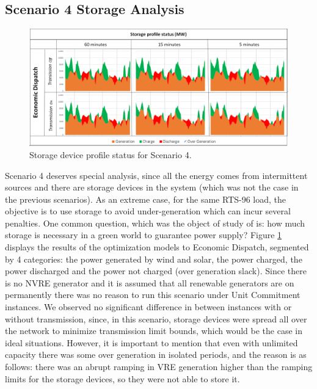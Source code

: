 \documentclass[12pt,LUDisStyle,twosided]{book}
\begin{document}
\newpage
\subsection{Scenario 4 Storage Analysis}

\begin{figure}[H] 
	\begin{center}
		\includegraphics[width=\textwidth,keepaspectratio]{StorageProfileStatusS4.png}
	  	\caption{Storage device profile status for Scenario 4.}
     	\label{fig:storageprofilestatus}
	\end{center}
\end{figure}

Scenario 4 deserves special analysis, since all the energy comes from intermittent sources and there are storage devices in the system (which was not the case in the previous scenarios). As an extreme case, for the same RTS-96 load, the objective is to use storage to avoid under-generation which can incur several penalties. One common question, which was the object of study of \citeauthor{safaei} \cite{safaei} is: how much storage is necessary in a green world to guarantee power supply? Figure \ref{fig:storageprofilestatus} displays the results of the optimization models to Economic Dispatch, segmented by 4 categories: the power generated by wind and solar, the power charged, the power discharged and the power not charged (over generation slack). Since there is no NVRE generator and it is assumed that all renewable generators are on permanently there was no reason to run this scenario under Unit Commitment instances. We observed no significant difference in between instances with or without transmission, since, in this scenario, storage devices were spread all over the network to minimize transmission limit bounds, which would be the case in ideal situations. However, it is important to mention that even with unlimited capacity there was some over generation in isolated periods, and the reason is as follows: there was an abrupt ramping in VRE generation higher than the ramping limits for the storage devices, so they were not able to store it. 
\end{document}
